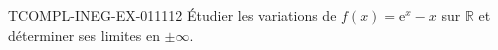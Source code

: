\begin{exercice}{TCOMPL-INEG-EX-011}{1}{12}
Étudier les variations de $f(x) = \mathrm{e}^x - x$ sur $\mathbb{R}$ et déterminer ses limites en $\pm\infty$.

\end{exercice}
